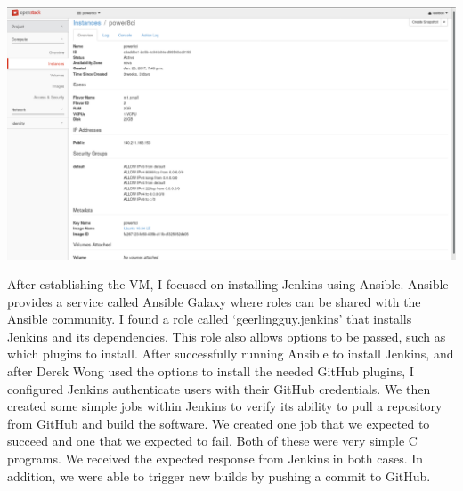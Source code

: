 \documentclass[10pt,onecolumn,journal,draftclsnofoot]{IEEEtran}
\begin{document}
\includegraphics[width=\textwidth, keepaspectratio]{openstack.eps}

After establishing the VM, I focused on installing Jenkins using Ansible.
Ansible provides a service called Ansible Galaxy where roles can be shared with the Ansible community.
I found a role called `geerlingguy.jenkins' that installs Jenkins and its dependencies.
This role also allows options to be passed, such as which plugins to install.
After successfully running Ansible to install Jenkins, and after Derek Wong used the options to install the needed GitHub plugins,
I configured Jenkins authenticate users with their GitHub credentials.
We then created some simple jobs within Jenkins to verify its ability to pull a repository from GitHub and build the software.
We created one job that we expected to succeed and one that we expected to fail.
Both of these were very simple C programs.
We received the expected response from Jenkins in both cases.
In addition, we were able to trigger new builds by pushing a commit to GitHub.
\end{document}
